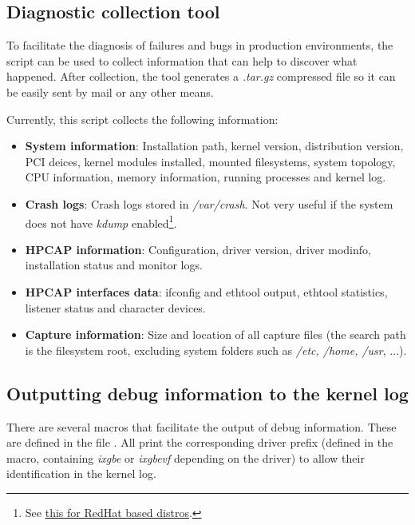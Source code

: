 \documentclass[oneside]{hpman}
\begin{document}
\subsection{Diagnostic collection tool}

To facilitate the diagnosis of failures and bugs in production environments, the script  can be used to collect information that can help to discover what happened. After collection, the tool generates a \textit{.tar.gz} compressed file so it can be easily sent by mail or any other means.

Currently, this script collects the following information:

\begin{itemize}[itemsep=0pt]
\item \textbf{System information}: Installation path, kernel version, distribution version, PCI deices, kernel modules installed, mounted filesystems, system topology, CPU information, memory information, running processes and kernel log.
\item \textbf{Crash logs}: Crash logs stored in \textit{/var/crash}. Not very useful if the system does not have \textit{kdump} enabled\footnote{See \href{https://fedoraproject.org/wiki/How_to_use_kdump_to_debug_kernel_crashes}{this for RedHat based distros}.}.
\item \textbf{HPCAP information}: Configuration, driver version, driver modinfo, installation status and monitor logs.
\item \textbf{HPCAP interfaces data}: ifconfig and ethtool output, ethtool statistics, listener status and character devices.
\item \textbf{Capture information}: Size and location of all capture files (the search path is the filesystem root, excluding system folders such as \textit{/etc, /home, /usr}, ...).
\end{itemize}

\subsection{Outputting debug information to the kernel log}
\label{sec:debugtest:macros}

There are several macros that facilitate the output of debug information. These are defined in the file . All print the corresponding driver prefix (defined in the  macro, containing \textit{ixgbe} or \textit{ixgbevf} depending on the driver) to allow their identification in the kernel log.
\end{document}
